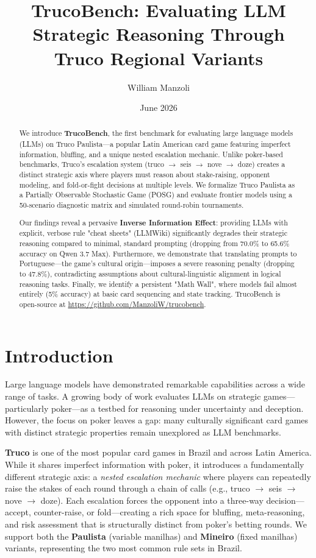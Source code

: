 \documentclass[11pt]{article}
\title{TrucoBench: Evaluating LLM Strategic Reasoning Through Truco Regional Variants}
\author{William Manzoli}
\date{June 2026}
\begin{document}
\maketitle

\begin{abstract}
We introduce \textbf{TrucoBench}, the first benchmark for evaluating large language models (LLMs) on Truco Paulista---a popular Latin American card game featuring imperfect information, bluffing, and a unique nested escalation mechanic. Unlike poker-based benchmarks, Truco's escalation system (truco $\to$ seis $\to$ nove $\to$ doze) creates a distinct strategic axis where players must reason about stake-raising, opponent modeling, and fold-or-fight decisions at multiple levels. We formalize Truco Paulista as a Partially Observable Stochastic Game (POSG) and evaluate frontier models using a 50-scenario diagnostic matrix and simulated round-robin tournaments. 

Our findings reveal a pervasive \textbf{Inverse Information Effect}: providing LLMs with explicit, verbose rule "cheat sheets" (LLMWiki) significantly degrades their strategic reasoning compared to minimal, standard prompting (dropping from 70.0\% to 65.6\% accuracy on Qwen 3.7 Max). Furthermore, we demonstrate that translating prompts to Portuguese---the game's cultural origin---imposes a severe reasoning penalty (dropping to 47.8\%), contradicting assumptions about cultural-linguistic alignment in logical reasoning tasks. Finally, we identify a persistent "Math Wall", where models fail almost entirely (5\% accuracy) at basic card sequencing and state tracking. TrucoBench is open-source at \url{https://github.com/ManzoliW/trucobench}.
\end{abstract}

\section{Introduction}

Large language models have demonstrated remarkable capabilities across a wide range of tasks. A growing body of work evaluates LLMs on strategic games---particularly poker---as a testbed for reasoning under uncertainty and deception. However, the focus on poker leaves a gap: many culturally significant card games with distinct strategic properties remain unexplored as LLM benchmarks.

\textbf{Truco} is one of the most popular card games in Brazil and across Latin America. While it shares imperfect information with poker, it introduces a fundamentally different strategic axis: a \emph{nested escalation mechanic} where players can repeatedly raise the stakes of each round through a chain of calls (e.g., truco $\to$ seis $\to$ nove $\to$ doze). Each escalation forces the opponent into a three-way decision---accept, counter-raise, or fold---creating a rich space for bluffing, meta-reasoning, and risk assessment that is structurally distinct from poker's betting rounds. We support both the \textbf{Paulista} (variable manilhas) and \textbf{Mineiro} (fixed manilhas) variants, representing the two most common rule sets in Brazil.
\end{document}
